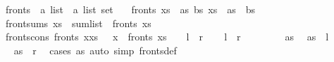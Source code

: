 \begin{isabellebody}
\isanewline
{}\isamarkupfalse%
\ fronts\ {\isacharcolon}{\kern0pt}{\isacharcolon}{\kern0pt}\ {\isachardoublequoteopen}{\isacharprime}{\kern0pt}a\ list\ {\isasymRightarrow}\ {\isacharprime}{\kern0pt}a\ list\ set{\isachardoublequoteclose}\ \isanewline
\ \ {\isachardoublequoteopen}fronts\ xs\ {\isacharequal}{\kern0pt}\ {\isacharbraceleft}{\kern0pt}as{\isachardot}{\kern0pt}\ {\isasymexists}bs{\isachardot}{\kern0pt}\ xs\ {\isacharequal}{\kern0pt}\ as\ {\isacharat}{\kern0pt}\ bs{\isacharbraceright}{\kern0pt}{\isachardoublequoteclose}\isanewline
\isanewline
{}\isamarkupfalse%
\ {\isachardoublequoteopen}front{\isacharunderscore}{\kern0pt}sums\ xs\ {\isasymequiv}\ sum{\isacharunderscore}{\kern0pt}list\ {\isacharbackquote}{\kern0pt}\ fronts\ xs{\isachardoublequoteclose}\isanewline
\isanewline
{}\isamarkupfalse%
\ fronts{\isacharunderscore}{\kern0pt}cons{\isacharcolon}{\kern0pt}\ {\isachardoublequoteopen}fronts\ {\isacharparenleft}{\kern0pt}x{\isacharhash}{\kern0pt}xs{\isacharparenright}{\kern0pt}\ {\isacharequal}{\kern0pt}\ {\isacharparenleft}{\kern0pt}{\isacharparenleft}{\kern0pt}{\isacharhash}{\kern0pt}{\isacharparenright}{\kern0pt}\ x{\isacharparenright}{\kern0pt}\ {\isacharbackquote}{\kern0pt}\ fronts\ xs\ {\isasymunion}\ {\isacharbraceleft}{\kern0pt}{\isacharbrackleft}{\kern0pt}{\isacharbrackright}{\kern0pt}{\isacharbraceright}{\kern0pt}{\isachardoublequoteclose}\ {\isacharparenleft}{\kern0pt}\ {\isachardoublequoteopen}{\isacharquery}{\kern0pt}l\ {\isacharequal}{\kern0pt}\ {\isacharquery}{\kern0pt}r{\isachardoublequoteclose}{\isacharparenright}{\kern0pt}\isanewline
%
\isadelimproof
%
\endisadelimproof
%
\isatagproof
{}\isamarkupfalse%
\isanewline
\ \ \isamarkupfalse%
\ {\isachardoublequoteopen}{\isacharquery}{\kern0pt}l\ {\isasymsubseteq}\ {\isacharquery}{\kern0pt}r{\isachardoublequoteclose}\isanewline
\ \ \isamarkupfalse%
\isanewline
\ \ \ \ \isamarkupfalse%
\ as\ \isamarkupfalse%
\ {\isachardoublequoteopen}as\ {\isasymin}\ {\isacharquery}{\kern0pt}l{\isachardoublequoteclose}\isanewline
\ \ \ \ \isamarkupfalse%
\ \isamarkupfalse%
\ {\isachardoublequoteopen}as\ {\isasymin}\ {\isacharquery}{\kern0pt}r{\isachardoublequoteclose}\ \isamarkupfalse%
\ {\isacharparenleft}{\kern0pt}cases\ as{\isacharparenright}{\kern0pt}\ {\isacharparenleft}{\kern0pt}auto\ simp{\isacharcolon}{\kern0pt}\ fronts{\isacharunderscore}{\kern0pt}def{\isacharparenright}{\kern0pt}\isanewline

\end{isabellebody}
